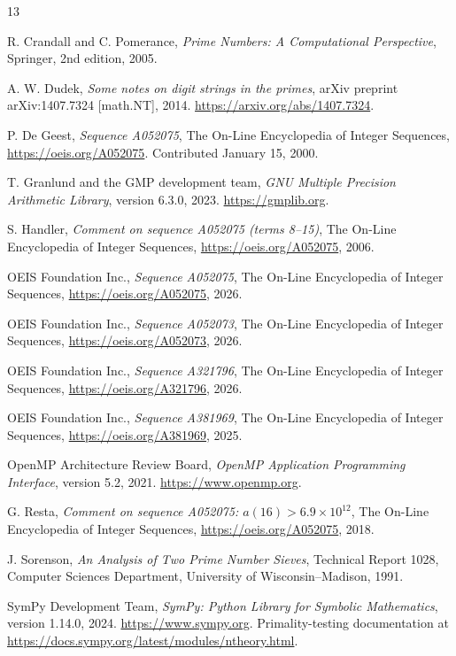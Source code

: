 \documentclass[11pt]{article}
\theoremstyle{definition}
\theoremstyle{remark}
\begin{document}
\begin{thebibliography}{13}
\sloppy
\raggedright

R. Crandall and C. Pomerance,
\emph{Prime Numbers: A Computational Perspective},
Springer, 2nd edition, 2005.

A. W. Dudek,
\emph{Some notes on digit strings in the primes},
arXiv preprint arXiv:1407.7324 [math.NT], 2014.
\url{https://arxiv.org/abs/1407.7324}.

P. De Geest,
\emph{Sequence A052075},
The On-Line Encyclopedia of Integer Sequences,
\url{https://oeis.org/A052075}.
Contributed January 15, 2000.

T. Granlund and the GMP development team,
\emph{GNU Multiple Precision Arithmetic Library},
version 6.3.0, 2023.
\url{https://gmplib.org}.

S. Handler,
\emph{Comment on sequence A052075 (terms 8--15)},
The On-Line Encyclopedia of Integer Sequences,
\url{https://oeis.org/A052075}, 2006.

OEIS Foundation Inc.,
\emph{Sequence A052075},
The On-Line Encyclopedia of Integer Sequences,
\url{https://oeis.org/A052075}, 2026.

OEIS Foundation Inc.,
\emph{Sequence A052073},
The On-Line Encyclopedia of Integer Sequences,
\url{https://oeis.org/A052073}, 2026.

OEIS Foundation Inc.,
\emph{Sequence A321796},
The On-Line Encyclopedia of Integer Sequences,
\url{https://oeis.org/A321796}, 2026.

OEIS Foundation Inc.,
\emph{Sequence A381969},
The On-Line Encyclopedia of Integer Sequences,
\url{https://oeis.org/A381969}, 2025.

OpenMP Architecture Review Board,
\emph{OpenMP Application Programming Interface},
version 5.2, 2021.
\url{https://www.openmp.org}.

G. Resta,
\emph{Comment on sequence A052075: \(a(16) > 6.9 \times 10^{12}\)},
The On-Line Encyclopedia of Integer Sequences,
\url{https://oeis.org/A052075}, 2018.

J. Sorenson,
\emph{An Analysis of Two Prime Number Sieves},
Technical Report 1028, Computer Sciences Department,
University of Wisconsin--Madison, 1991.

SymPy Development Team,
\emph{SymPy: Python Library for Symbolic Mathematics},
version 1.14.0, 2024.
\url{https://www.sympy.org}.
Primality-testing documentation at
\url{https://docs.sympy.org/latest/modules/ntheory.html}.

\end{thebibliography}
\end{document}
